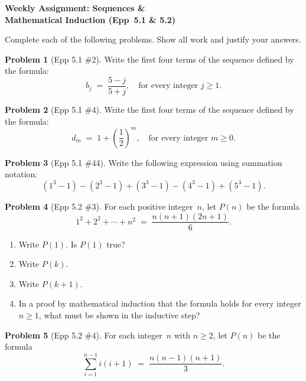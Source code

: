 \documentclass[11pt]{article}
\begin{document}
\begin{center}
  {\Large\bfseries Weekly Assignment: Sequences \&\\[2pt]
   Mathematical Induction (Epp~5.1 \& 5.2)}
\end{center}

\bigskip

\noindent
Complete each of the following problems.  Show all work and justify your answers.

\bigskip

\noindent\textbf{Problem 1} (Epp 5.1 \#2). \;
Write the first four terms of the sequence defined by the
formula:
\[
  b_j \;=\; \frac{5-j}{5+j},
  \quad\text{for every integer } j \ge 1.
\]

\bigskip

\noindent\textbf{Problem 2} (Epp 5.1 \#4). \;
Write the first four terms of the sequence defined by the
formula:
\[
  d_m \;=\; 1 + \left(\frac{1}{2}\right)^{m},
  \quad\text{for every integer } m \ge 0.
\]

\bigskip

\noindent\textbf{Problem 3} (Epp 5.1 \#44). \;
Write the following expression using summation notation:
\[
  (1^3 - 1) - (2^3 - 1) + (3^3 - 1) - (4^3 - 1) + (5^3 - 1).
\]

\bigskip

\noindent\textbf{Problem 4} (Epp 5.2 \#3). \;
For each positive integer~$n$, let $P(n)$ be the formula
\[
  1^2 + 2^2 + \cdots + n^2 \;=\;
  \frac{n(n+1)(2n+1)}{6}.
\]

\begin{enumerate}[label=\textbf{\alph*.},itemsep=4pt]
  \item Write $P(1)$.  Is $P(1)$ true?
  \item Write $P(k)$.
  \item Write $P(k+1)$.
  \item In a proof by mathematical induction that the formula
        holds for every integer $n \ge 1$, what must be shown
        in the inductive step?
\end{enumerate}

\bigskip

\noindent\textbf{Problem 5} (Epp 5.2 \#4). \;
For each integer~$n$ with $n \ge 2$, let $P(n)$ be the formula
\[
  \sum_{i=1}^{n-1} i(i+1) \;=\;
  \frac{n(n-1)(n+1)}{3}.
\]
\end{document}
